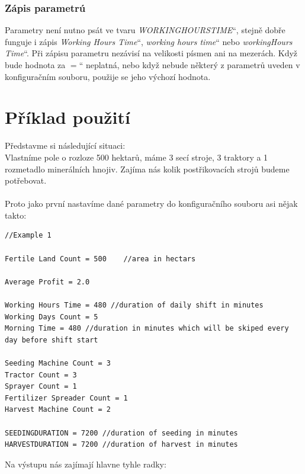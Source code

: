 \documentclass[11pt,a4paper,titlepage]{article}
\newcommand{\ceskeuvozovky}[1]{\quotedblbase#1\textquotedblleft}
\begin{document}
\subsubsection{Zápis parametrú}
Parametry není nutno psát ve tvaru \ceskeuvozovky{\emph{WORKINGHOURSTIME}}, stejně dobře funguje i zápis \ceskeuvozovky{\emph{Working Hours Time}}, \ceskeuvozovky{\emph{working hours time}} nebo \ceskeuvozovky{\emph{workingHours Time}}. Při zápisu parametru nezávisí na velikosti písmen ani na mezerách. Když bude hodnota za \ceskeuvozovky{$=$} neplatná, nebo když nebude některý z parametrů uveden v konfiguračním souboru, použije se jeho výchozí hodnota.

\section{Příklad použití}

Představme si následující situaci: \\
Vlastníme pole o rozloze 500 hektarů, máme 3 secí stroje, 3 traktory a 1 rozmetadlo minerálních hnojiv. Zajíma nás kolik postřikovacích strojů budeme potřebovat. \\ \\

Proto jako první nastavíme dané parametry do konfiguračního souboru asi nějak takto: \\

\begin{lstlisting}
//Example 1

Fertile Land Count = 500    //area in hectars

Average Profit = 2.0

Working Hours Time = 480 //duration of daily shift in minutes
Working Days Count = 5
Morning Time = 480 //duration in minutes which will be skiped every day before shift start

Seeding Machine Count = 3
Tractor Count = 3
Sprayer Count = 1
Fertilizer Spreader Count = 1
Harvest Machine Count = 2

SEEDINGDURATION = 7200 //duration of seeding in minutes
HARVESTDURATION = 7200 //duration of harvest in minutes
\end{lstlisting}
\vspace{45px}
Na výstupu nás zajímají hlavne tyhle radky: \\ \\
\end{document}
